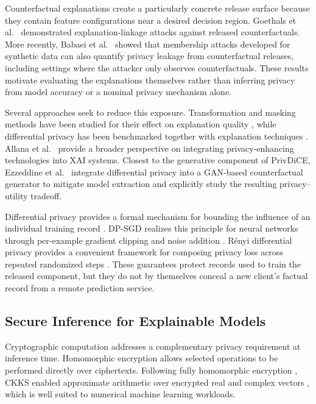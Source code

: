 \documentclass[preprint,12pt]{elsarticle}
\begin{document}
Counterfactual explanations create a particularly concrete release surface
because they contain feature configurations near a desired decision region.
Goethals et al.~\cite{goethals2023privacy} demonstrated explanation-linkage
attacks against released counterfactuals. More recently, Babaei et
al.~\cite{babaei2026privacycf} showed that membership attacks developed for
synthetic data can also quantify privacy leakage from counterfactual releases,
including settings where the attacker only observes counterfactuals. These
results motivate evaluating the explanations themselves rather than inferring
privacy from model accuracy or a nominal privacy mechanism alone.

Several approaches seek to reduce this exposure. Transformation and masking
methods have been studied for their effect on explanation quality
\cite{bozorgpanah2024explainable}, while differential privacy has been
benchmarked together with explanation techniques
\cite{saifullah2022privacy}. Allana et al.~\cite{allana2026petxai} provide a
broader perspective on integrating privacy-enhancing technologies into XAI
systems. Closest to the generative component of PrivDiCE, Ezzeddine et
al.~\cite{ezzeddine2026privatecf} integrate differential privacy into a
GAN-based counterfactual generator to mitigate model extraction and explicitly
study the resulting privacy--utility tradeoff.

Differential privacy provides a formal mechanism for bounding the influence of
an individual training record \cite{dwork2006calibrating}. DP-SGD realizes
this principle for neural networks through per-example gradient clipping and
noise addition \cite{abadi2016deep}. R\'enyi differential privacy provides a
convenient framework for composing privacy loss across repeated randomized
steps \cite{mironov2017rdp}. These guarantees protect records used to train the
released component, but they do not by themselves conceal a new client's
factual record from a remote prediction service.

\subsection{Secure Inference for Explainable Models}
\label{subsec:secure_inference}

Cryptographic computation addresses a complementary privacy requirement at
inference time. Homomorphic encryption allows selected operations to be
performed directly over ciphertexts. Following fully homomorphic encryption
\cite{gentry2009fully}, CKKS enabled approximate arithmetic over encrypted real
and complex vectors \cite{cheon2017homomorphic}, which is well suited to
numerical machine learning workloads.
\end{document}
